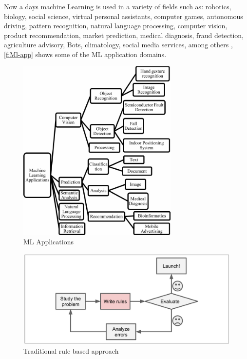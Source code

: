 Now a days machine Learning is used in a variety of fields such as: robotics, biology, social science, virtual personal assistants, computer games, autonomous driving, pattern recognition, natural language processing, computer vision, product recommendation, market prediction, medical diagnosis, fraud detection, agriculture advisory, Bots, climatology, social media services, among others \cite{Srivastava_2019, Shinde_2018, Ray2019}, \autoref{f:Ml-app} shows some of the \ac{ML} application domains. 

\begin{figure}[t]
\centering
\includegraphics[width=8cm]{figures/Ch2/ML-Applications.png}
\caption{ML Applications \cite{Shinde_2018}}
\label{f:Ml-app}
\end{figure}

\begin{figure}[h]
\centering
\includegraphics[width=14cm]{figures/Ch2/Tradicional-Approach.png}
\caption{Traditional rule based approach \cite{geron2017}}
\label{f:Traditional-approach}
\end{figure}


